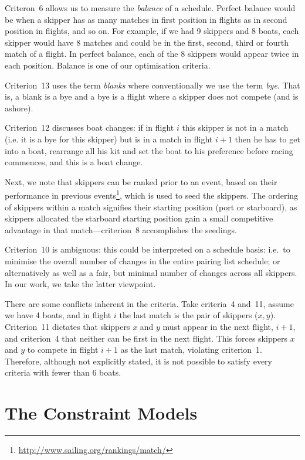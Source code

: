 \documentclass{llncs}
\begin{document}
Criteron~6 allows us to measure the \emph{balance} of a schedule. Perfect balance would be when a skipper has as many matches in first position in flights as in second position in flights, and so on. For example, if we had 9 skippers and 8 boats, each skipper would have 8 matches and could be in the first, second, third or fourth match of a flight. In perfect balance, each of the 8 skippers would appear twice in each position. Balance is one of our optimisation criteria.

Criterion~13 uses the term \emph{blanks} where conventionally we use the term \emph{bye}. That is, a blank is a bye and a bye is a flight where a skipper does not compete (and is ashore).

Criterion~12 discusses boat changes: if in flight $i$ this skipper is not in a match (i.e. it is a
bye for this skipper) but is in a match in flight $i+1$ then he has to get into a boat, rearrange
all his kit and set the boat to his preference before racing commences, and this is a boat change. 

Next, we note that skippers can be ranked prior to an event, based on their performance in
previous events\footnote{\url{http://www.sailing.org/rankings/match/}}, which is used to seed the
skippers. The ordering of skippers within a match signifies their starting position (port or
starboard), as skippers allocated the starboard starting position gain a small competitive
advantage in that match---criterion~8 accomplishes the seedings.

Criterion~10 is ambiguous: this could be interpreted on a schedule basis: i.e.\ to minimise the
overall number of changes in the entire pairing list schedule; or alternatively as well as a fair,
but minimal number of changes across all skippers. In our work, we take the latter viewpoint.

There are some conflicts inherent in the criteria. Take criteria~4 and~11, assume we have 4 boats, and
in flight $i$ the last match is the pair of skippers ($x,y$). Criterion~11 dictates that skippers $x$
and $y$ must appear in the next flight, $i+1$, and criterion~4 that neither can be first in the next
flight. This forces skippers $x$ and $y$ to compete in flight $i+1$ as the last match, violating
criterion~1. Therefore, although not explicitly stated, it is not possible to satisfy every criteria
with fewer than 6 boats.

\section{The Constraint Models}\label{sec:models}
\end{document}
